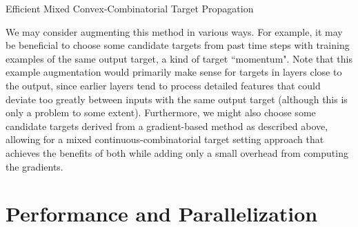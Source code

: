 \documentclass[12pt,letterpaper]{article}
\begin{document}
\begin{algorithm}
\caption{Efficient Mixed Convex-Combinatorial Target Propagation}
\begin{algorithmic}  
\ELSE
{}
\ENDFOR
{}
\ENDIF
\ENDFOR
\ENDFOR
\end{algorithmic}
\end{algorithm} 

We may consider augmenting this method in various ways. For example, it may be beneficial to choose some candidate targets from past time steps with training examples of the same output target, a kind of target ``momentum". Note that this example augmentation would primarily make sense for targets in layers close to the output, since earlier layers tend to process detailed features that could deviate too greatly between inputs with the same output target (although this is only a problem to some extent). Furthermore, we might also choose some candidate targets derived from a gradient-based method as described above, allowing for a mixed continuous-combinatorial target setting approach that achieves the benefits of both while adding only a small overhead from computing the gradients.


\section{Performance and Parallelization}
\end{document}

